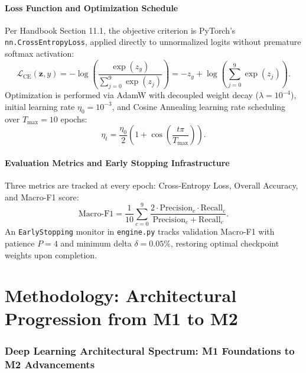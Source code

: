 \documentclass[11pt, a4paper]{article}
\begin{document}
\subsection{Loss Function and Optimization Schedule}
Per Handbook Section 11.1, the objective criterion is PyTorch's \texttt{nn.CrossEntropyLoss}, applied directly to unnormalized logits without premature softmax activation:
\begin{equation}
  \mathcal{L}_{\text{CE}}(\mathbf{z}, y) = -\log \left( \frac{\exp(z_y)}{\sum_{j=0}^9 \exp(z_j)} \right) = -z_y + \log \left(\sum_{j=0}^9 \exp(z_j)\right).
\end{equation}
Optimization is performed via AdamW \cite{loshchilov2019decoupled} with decoupled weight decay ($\lambda = 10^{-4}$), initial learning rate $\eta_0 = 10^{-3}$, and Cosine Annealing learning rate scheduling over $T_{\max} = 10$ epochs:
\begin{equation}
  \eta_t = \frac{\eta_0}{2} \left(1 + \cos\left(\frac{t\pi}{T_{\max}}\right)\right).
\end{equation}

\subsection{Evaluation Metrics and Early Stopping Infrastructure}
Three metrics are tracked at every epoch: Cross-Entropy Loss, Overall Accuracy, and Macro-F1 score:
\begin{equation}
  \text{Macro-F1} = \frac{1}{10} \sum_{c=0}^9 \frac{2 \cdot \text{Precision}_c \cdot \text{Recall}_c}{\text{Precision}_c + \text{Recall}_c}.
\end{equation}
An \texttt{EarlyStopping} monitor in \texttt{engine.py} tracks validation Macro-F1 with patience $P=4$ and minimum delta $\delta=0.05\%$, restoring optimal checkpoint weights upon completion.

\newpage
\part{Methodology: Architectural Progression from M1 to M2}
\label{part:methodology}

\section{Deep Learning Architectural Spectrum: M1 Foundations to M2 Advancements}
\label{sec:architectures}
\end{document}
